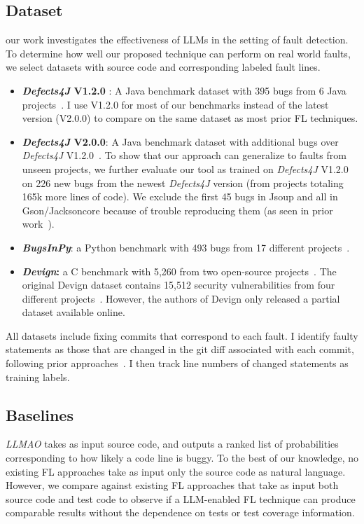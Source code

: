 \documentclass[12pt,openany,oneside,table]{cmuthesis}
\begin{document}
\subsection{Dataset}
our work investigates the effectiveness of LLMs in the setting of fault detection. 
To determine how well our proposed technique can perform on real world faults, we select datasets with source code and corresponding labeled fault lines. 
\begin{itemize}
\item{\textbf{\textit{Defects4J} V1.2.0 }:  A Java benchmark dataset with 395 bugs from 6 Java projects~\cite{just2014defects4j}.} 
I use V1.2.0 for most of our benchmarks instead of the latest version (V2.0.0) to compare on the same dataset as most prior FL techniques.
\item{\textbf{\textit{Defects4J} V2.0.0}:  A Java benchmark dataset with additional bugs over \textit{Defects4J} V1.2.0~\cite{just2014defects4j}.} To show that our approach can generalize to faults from unseen projects, we further evaluate our tool as trained on \textit{Defects4J} V1.2.0 on 226 new bugs from the newest \textit{Defects4J} version (from projects totaling 165k more lines of code). We exclude the first 45 bugs in Jsoup and all in Gson/Jacksoncore because of trouble reproducing them (as seen in prior work~\cite{lou2021boosting}).
\item{\textbf{\textit{BugsInPy}}: a Python benchmark with 493 bugs from 17 different projects~\cite{widyasari2020bugsinpy}.}
\item{\textbf{\textit{Devign}:} a C benchmark with 5,260 from two open-source projects~\cite{zhou2019devign}. The original Devign dataset contains 15,512 security vulnerabilities from four different projects~\cite{zhou2019devign}. However, the authors of Devign only released a partial dataset available online.} 



\end{itemize}
All datasets include fixing commits that correspond to each fault.  I identify faulty statements as those that are changed in the git diff associated with each commit, following prior approaches~\cite{meng2022improving,ray2016naturalness,li2019oopsla}.
I then track line numbers of changed statements as training labels.

\subsection{Baselines}
    \textit{LLMAO} takes as input source code, and outputs a ranked list of probabilities corresponding to how likely a code line is buggy. To the best of our knowledge, no existing FL approaches take as input only the source code as natural language. However, we compare against existing FL approaches that take as input both source code and test code to observe if a LLM-enabled FL technique can produce comparable results without the dependence on tests or test coverage information.
    
\end{document}
